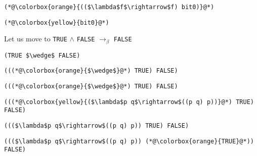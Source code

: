 \documentclass{beamer}
\begin{document}
\begin{frame}[fragile]{\CurrentSection}
\lstset{basicstyle=\ttfamily\small}\lstset{numbers=none}\lstset{language=ML}\begin{lstlisting}
(*@\colorbox{orange}{(($\lambda$f$\rightarrow$f) bit0)}@*)
\end{lstlisting}
\pause\lstset{language=ML}\begin{lstlisting}
(*@\colorbox{yellow}{bit0}@*)
\end{lstlisting}

\end{frame}

\begin{frame}[fragile]{\CurrentSection}
\begin{block}{\CurrentSubSection}
Let us move to \texttt{TRUE} $\wedge$ \texttt{FALSE} $\rightarrow_\beta$ \texttt{FALSE}
\end{block}


\end{frame}

\begin{frame}[fragile]{\CurrentSection}
\lstset{basicstyle=\ttfamily\small}\lstset{numbers=none}\lstset{language=ML}\begin{lstlisting}
(TRUE $\wedge$ FALSE)
\end{lstlisting}
\pause\lstset{language=ML}\begin{lstlisting}
(((*@\colorbox{orange}{$\wedge$}@*) TRUE) FALSE)
\end{lstlisting}

\end{frame}

\begin{frame}[fragile]{\CurrentSection}
\lstset{basicstyle=\ttfamily\small}\lstset{numbers=none}\lstset{language=ML}\begin{lstlisting}
(((*@\colorbox{orange}{$\wedge$}@*) TRUE) FALSE)
\end{lstlisting}
\pause\lstset{language=ML}\begin{lstlisting}
(((*@\colorbox{yellow}{($\lambda$p q$\rightarrow$((p q) p))}@*) TRUE) FALSE)
\end{lstlisting}

\end{frame}

\begin{frame}[fragile]{\CurrentSection}
\lstset{basicstyle=\ttfamily\small}\lstset{numbers=none}\lstset{language=ML}\begin{lstlisting}
((($\lambda$p q$\rightarrow$((p q) p)) TRUE) FALSE)
\end{lstlisting}
\pause\lstset{language=ML}\begin{lstlisting}
((($\lambda$p q$\rightarrow$((p q) p)) (*@\colorbox{orange}{TRUE}@*)) FALSE)
\end{lstlisting}

\end{frame}
\end{document}
